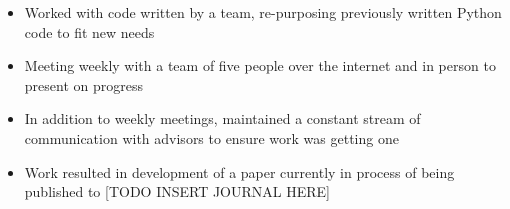 \documentclass[10pt,a4paper,ragged2e]{altacv}
\begin{document}

\begin{fullwidth}
\makecvheader
\end{fullwidth}



\begin{itemize}
\item Worked with code written by a team, re-purposing previously written Python code to fit new needs
\item Meeting weekly with a team of five people over the internet and in person to present on progress
\item In addition to weekly meetings, maintained a constant stream of communication with advisors to ensure work was getting one
\smallskip
\item Work resulted in development of a paper currently in process of being published to [TODO INSERT JOURNAL HERE] 
\end{itemize}
\end{document}
